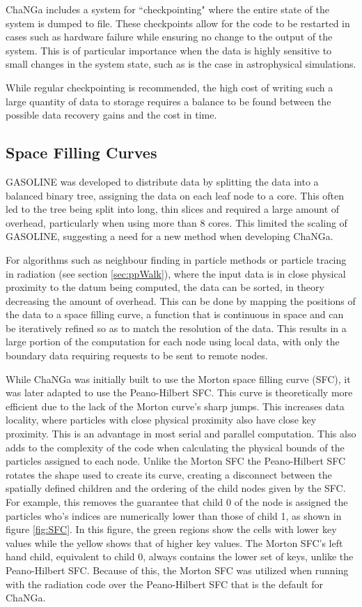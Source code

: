 ChaNGa includes a system for ``checkpointing" where the entire state of the system is dumped to file. These checkpoints allow for the code to be restarted in cases such as hardware failure while ensuring no change to the output of the system. This is of particular importance when the data is highly sensitive to small changes in the system state, such as is the case in astrophysical simulations.

While regular checkpointing is recommended, the high cost of writing such a large quantity of data to storage requires a balance to be found between the possible data recovery gains and the cost in time.
    
\subsection{Space Filling Curves}

GASOLINE was developed to distribute data by splitting the data into a balanced binary tree, assigning the data on each leaf node to a core. This often led to the tree being split into long, thin slices and required a large amount of overhead, particularly when using more than 8 cores. This limited the scaling of GASOLINE, suggesting a need for a new method when developing ChaNGa.

For algorithms such as neighbour finding in particle methods or particle tracing in radiation (see section \ref{sec:ppWalk}), where the input data is in close physical proximity to the datum being computed, the data can be sorted, in theory decreasing the amount of overhead. This can be done by mapping the positions of the data to a space filling curve, a function that is continuous in space and can be iteratively refined so as to match the resolution of the data. This results in a large portion of the computation for each node using local data, with only the boundary data requiring requests to be sent to remote nodes.


While ChaNGa was initially built to use the Morton space filling curve (SFC), it was later adapted to use the Peano-Hilbert SFC. This curve is theoretically more efficient due to the lack of the Morton curve's sharp jumps. This increases data locality, where particles with close physical proximity also have close key proximity. This is an advantage in most serial and parallel computation. This also adds to the complexity of the code when calculating the physical bounds of the particles assigned to each node. Unlike the Morton SFC the Peano-Hilbert SFC rotates the shape used to create its curve, creating a disconnect between the spatially defined children and the ordering of the child nodes given by the SFC. For example, this removes the guarantee that child 0 of the node is assigned the particles who's indices are numerically lower than those of child 1, as shown in figure \ref{fig:SFC}. In this figure, the green regions show the cells with lower key values while the yellow shows that of higher key values. The Morton SFC's left hand child, equivalent to child 0, always contains the lower set of keys, unlike the Peano-Hilbert SFC. Because of this, the Morton SFC was utilized when running with the radiation code over the Peano-Hilbert SFC that is the default for ChaNGa.

